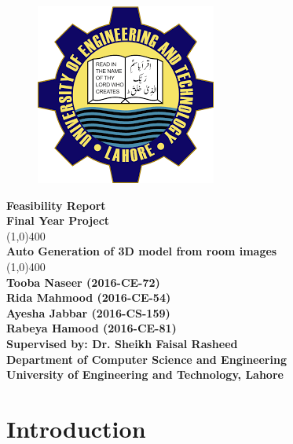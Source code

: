 \documentclass{article}
\begin{document}
\begin{titlepage}
\begin{center}
\vspace*{1cm}
\begin{figure}[h!]
\centering
\includegraphics[scale=0.5]{logo}
\end{figure}
\Large\textbf{Feasibility Report}\\
\Large\textbf{Final Year Project}\\
\vfill
\line(1,0){400}\\[1mm]
\huge{\textbf{Auto Generation of 3D model from room images}}\\[3mm]
\line(1,0){400}\\
\vfill
\large{\textbf{Tooba Naseer  (2016-CE-72)}}\\
\large{\textbf{Rida Mahmood  (2016-CE-54)}}\\
\large{\textbf{Ayesha Jabbar  (2016-CS-159)}}\\
\large{\textbf{Rabeya Hamood  (2016-CE-81)}}\\
\large{\textbf{Supervised by: Dr. Sheikh Faisal Rasheed}}\\
\large{\textbf{Department of Computer Science and Engineering}}\\
\large{\textbf{University of Engineering and Technology, Lahore}}\\
\end{center}
\end{titlepage}
\tableofcontents
\thispagestyle{empty}
\clearpage
\setcounter{page}{1}

\makeatletter
\newcommand{\heading}[1]%
{\par\vskip 1.5ex \@plus .2ex
 \hangindent=1em
 \noindent\makebox[1em][l]{$\,\bullet$}\textbf{\large #1}%
\par\vskip 1.5ex \@plus .2ex
\@afterheading}
\makeatother

\section{Introduction}
\end{document}
